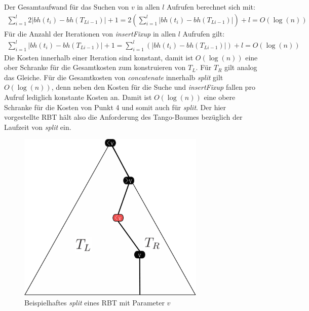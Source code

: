\documentclass[a4paper,12pt]{article}
\begin{document}
\noindent Der Gesamtaufwand für das Suchen von $v$ in allen $l$ Aufrufen berechnet sich mit: 
\begin{align*}
\sum_{i = 1}^{l}  2 \vert\mathit{bh}(t_{i}) -\mathit{bh}(T_{Li-1}) \vert + 1 =
2 \left( \sum_{i = 1}^{l}   \vert\mathit{bh}(t_{i}) -\mathit{bh}(T_{Li-1}) \vert \right)+ l
= O \left(\log \left(n \right) \right)
\end{align*}
\noindent Für die Anzahl der Iterationen von \textit{insertFixup} in allen $l$ Aufrufen gilt: 
\begin{align*}
\sum_{i = 1}^{l}   \vert\mathit{bh}(t_{i}) -\mathit{bh}(T_{Li-1}) \vert +1 =
\sum_{i = 1}^{l}  \left( \vert\mathit{bh}(t_{i}) -\mathit{bh}(T_{Li-1}) \vert \right) + l 
= O \left(\log \left(n \right) \right)
\end{align*}
Die Kosten innerhalb einer Iteration sind konstant, damit ist  $O \left(\log \left(n \right) \right)$ eine ober Schranke für die Gesamtkosten zum konstruieren von $T_L$. Für $T_R$ gilt analog das Gleiche. Für die Gesamtkosten von \textit{concatenate} innerhalb \textit{split} gilt $O \left(\log \left(n \right) \right)$, denn neben den Kosten für die Suche und \textit{insertFixup} fallen pro Aufruf lediglich konstante Kosten an. Damit ist $O \left(\log \left(n \right) \right)$ eine obere Schranke für die Kosten von Punkt 4 und somit auch für \textit{split}. Der hier vorgestellte RBT hält also die Anforderung des Tango-Baumes bezüglich der Laufzeit von \textit{split} ein.







\begin{figure}[h]
	\centering
	\includegraphics[width=0.8\textwidth]{"Medien/RotSchwarzBaum/aufteilen"}
	\caption{Beispielhaftes \textit{split} eines RBT mit Parameter $v$ }
	\label{fig:aufteilen}
\end{figure}
\end{document}
